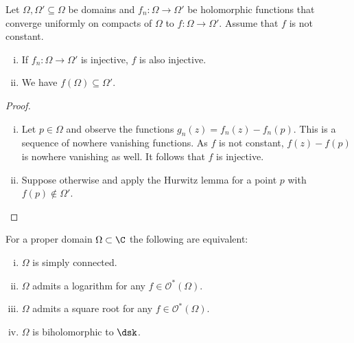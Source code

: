 \begin{izrek}[Hurwitz]
Let $\Omega, \Omega' \subseteq \Omega$ be domains and
$f_n \colon \Omega \to \Omega'$ be holomorphic functions that
converge uniformly on compacts of $\Omega$ to
$f \colon \Omega \to \Omega'$. Assume that $f$ is not constant.

\begin{enumerate}[i)]
\item If $f_n \colon \Omega \to \Omega'$ is injective, $f$ is also
injective.
\item We have $f(\Omega) \subseteq \Omega'$.
\end{enumerate}
\end{izrek}

\begin{proof}
\phantom{a}
\begin{enumerate}[i)]
\item Let $p \in \Omega$ and observe the functions
$g_n(z) = f_n(z) - f_n(p)$. This is a sequence of nowhere vanishing
functions. As $f$ is not constant, $f(z) - f(p)$ is nowhere
vanishing as well. It follows that $f$ is injective.
\item Suppose otherwise and apply the Hurwitz lemma for a point
$p$ with $f(p) \not \in \Omega'$. \qedhere
\end{enumerate}
\end{proof}

\begin{izrek}
For a proper domain $\Omega \subset \C$ the following are
equivalent:

\begin{enumerate}[i)]
\item $\Omega$ is simply connected.
\item $\Omega$ admits a logarithm for any
$f \in \mathcal{O}^*(\Omega)$.
\item $\Omega$ admits a square root for any
$f \in \mathcal{O}^*(\Omega)$.
\item $\Omega$ is biholomorphic to $\dsk$.
\end{enumerate}
\end{izrek}

